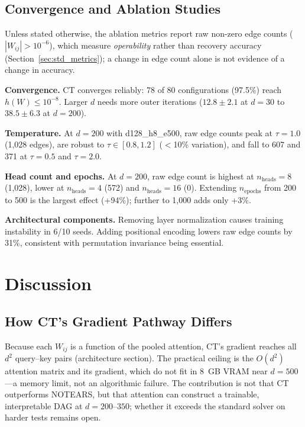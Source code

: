\documentclass[12pt,a4paper]{article}
\begin{document}
\subsection{Convergence and Ablation Studies}\label{sec:convergence_ablation}

Unless stated otherwise, the ablation metrics report raw non-zero edge counts ($|W_{ij}| > 10^{-6}$), which measure \emph{operability} rather than recovery accuracy (Section~\ref{sec:std_metrics}); a change in edge count alone is not evidence of a change in accuracy.

\textbf{Convergence.} CT converges reliably: 78 of 80 configurations (97.5\%) reach $h(W) \le 10^{-8}$. Larger $d$ needs more outer iterations ($12.8 \pm 2.1$ at $d=30$ to $38.5 \pm 6.3$ at $d=200$).

\textbf{Temperature.} At $d=200$ with d128\_h8\_e500, raw edge counts peak at $\tau=1.0$ (1,028 edges), are robust to $\tau \in [0.8, 1.2]$ ($<$10\% variation), and fall to 607 and 371 at $\tau=0.5$ and $\tau=2.0$.

\textbf{Head count and epochs.} At $d=200$, raw edge count is highest at $n_{\text{heads}}=8$ (1,028), lower at $n_{\text{heads}}=4$ (572) and $n_{\text{heads}}=16$ (0). Extending $n_{\text{epochs}}$ from 200 to 500 is the largest effect (+94\%); further to 1,000 adds only +3\%.

\textbf{Architectural components.} Removing layer normalization causes training instability in 6/10 seeds. Adding positional encoding lowers raw edge counts by 31\%, consistent with permutation invariance being essential.

\section{Discussion}

\subsection{How CT's Gradient Pathway Differs}

Because each $W_{ij}$ is a function of the pooled attention, CT's gradient reaches all $d^2$ query--key pairs (architecture section). The practical ceiling is the $O(d^2)$ attention matrix and its gradient, which do not fit in 8~GB VRAM near $d=500$---a memory limit, not an algorithmic failure. The contribution is not that CT outperforms NOTEARS, but that attention can construct a trainable, interpretable DAG at $d=200$--$350$; whether it exceeds the standard solver on harder tests remains open.
\end{document}
